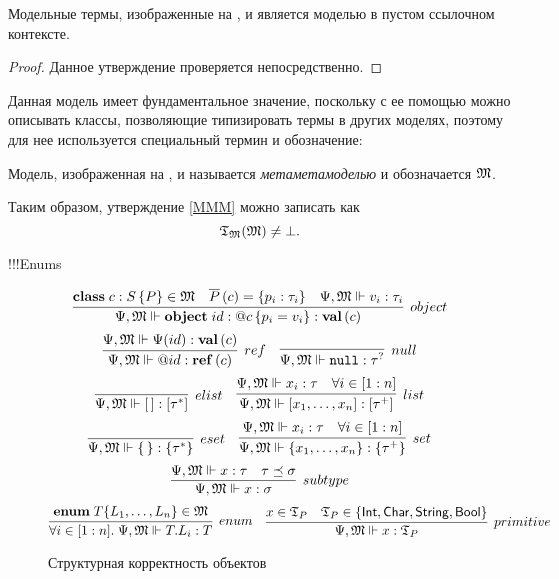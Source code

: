 \begin{Prop}\label{MMM}
Модельные термы, изображенные на ,  и  является моделью в пустом ссылочном контексте.
\end{Prop}
\begin{proof}
Данное утверждение проверяется непосредственно.
\end{proof}

Данная модель имеет фундаментальное значение, поскольку с ее помощью можно описывать классы, позволяющие типизировать термы в других моделях, поэтому для нее используется специальный термин и обозначение:
\begin{Def}
Модель, изображенная на ,  и  называется \emph{метаметамоделью} и обозначается $\mathfrak{M}$.
\end{Def}
Таким образом, утверждение \ref{MMM} можно записать как $$\mathfrak{T}_{\mathfrak{M}}(\mathfrak{M}) \neq \bot.$$

!!!Enums

\begin{figure}[htbp]
	\centering
$$
	\infer[object]{
		\fromMM \Object{id}{\Ref{c}}{p_i = v_i} : \ClassT{c}
	}{
		\Class{c}{S}{P} \in \MM{M}&
		\AllProps{c} = \{p_i : \tau_i\}&
		\fromMM v_i : \tau_i
	}
$$
$$
\infer[ref]{
	\fromMM \Ref{id} : \RefT{c}
}{
	\fromMM \RContext(id) : \ClassT{c}
}
\quad
\infer[null]{
	\fromMM \Null : \NullableT{\tau}
}{}
$$
$$
\infer[elist]{
	\fromMM \List{\,} : \ListT{\tau^*}
}{}
\quad
\infer[list]{
	\fromMM \List{x_1, \ldots, x_n} : \List{\tau^+}
}{
	\fromMM x_i : \tau & \forall i\in[1:n]
}
$$
$$
\infer[eset]{
	\fromMM \Set{\,} : \SetT{\tau^*}
}{}
\quad
\infer[set]{
	\fromMM \Set{x_1, \ldots, x_n} : \SetT{\tau^+}
}{
	\fromMM x_i : \tau & \forall i\in[1:n]
}
$$
$$
\infer[subtype]{
	\fromMM x : \sigma
}{
	\fromMM x : \tau &
	\tau \subtype \sigma
}
$$
$$
\infer[enum]{
	\forall i \in [1:n]. \; \fromMM T.L_i : T
}{
	\mathbf{enum}\;T\{L_1,\ldots,L_n\} \in \MM{M}
}
\quad
\infer[primitive]{
	\fromMM x : \Types_P
}{
	x \in \Types_P & 
	\Types_P \in \{\IntegerT, \CharT, \StringT, \BooleanT\}
}
$$
	\caption{Структурная корректность объектов}\label{TypesMM}
\end{figure}



